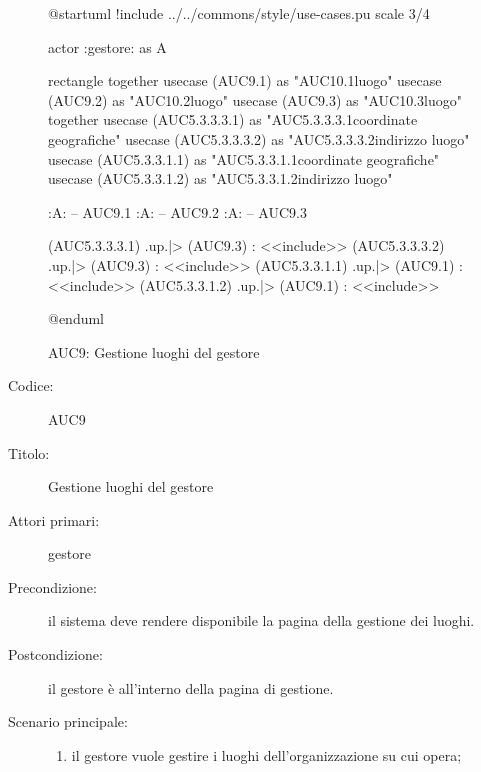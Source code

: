 \documentclass[../../../analisi-dei-requisiti.tex]{subfiles}
\begin{document}
\begin{figure}[h!]
  \centering
  \begin{plantuml}
  @startuml
  !include ../../commons/style/use-cases.pu
  scale 3/4

  actor :gestore: as A

  rectangle {
    together {
      usecase (AUC9.1) as "AUC10.1\nAggiunta luogo"
      usecase (AUC9.2) as "AUC10.2\nRimozione luogo"
      usecase (AUC9.3) as "AUC10.3\nModifica luogo"
    }
    together {
      usecase (AUC5.3.3.3.1) as "AUC5.3.3.3.1\nModifica coordinate geografiche"
      usecase (AUC5.3.3.3.2) as "AUC5.3.3.3.2\nModifica indirizzo luogo"
      usecase (AUC5.3.3.1.1) as "AUC5.3.3.1.1\nInserisci coordinate geografiche"
      usecase (AUC5.3.3.1.2) as "AUC5.3.3.1.2\nInserisci indirizzo luogo"
    }
  }

  :A: -- AUC9.1
  :A: -- AUC9.2
  :A: -- AUC9.3

  (AUC5.3.3.3.1) .up.|> (AUC9.3) : <<include>>
  (AUC5.3.3.3.2) .up.|> (AUC9.3) : <<include>>
  (AUC5.3.3.1.1) .up.|> (AUC9.1) : <<include>>
  (AUC5.3.3.1.2) .up.|> (AUC9.1) : <<include>>

  @enduml
  \end{plantuml}
  \caption{AUC9: Gestione luoghi del gestore}
  \label{fig:AUC9}
\end{figure}

\begin{description}
  \item[Codice:] AUC9
  \item[Titolo:] Gestione luoghi del gestore
  \item[Attori primari:] gestore
  \item[Precondizione:] il sistema deve rendere disponibile la pagina della gestione dei luoghi.
  \item[Postcondizione:] il gestore è all'interno della pagina di gestione.
  \item[Scenario principale:]
  \begin{enumerate}
    \item il gestore vuole gestire i luoghi dell'organizzazione su cui opera;
  \end{enumerate}
\end{description}
\end{document}
